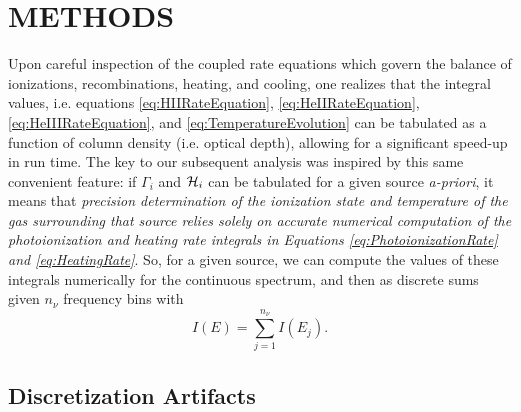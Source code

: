 \documentclass[preprint2]{aastex}              %
\begin{document}
\section{METHODS}
Upon careful inspection of the coupled rate equations which govern the balance
of ionizations, recombinations, heating, and cooling, one realizes that the
integral values, i.e. equations \ref{eq:HIIRateEquation},
\ref{eq:HeIIRateEquation}, \ref{eq:HeIIIRateEquation}, and
\ref{eq:TemperatureEvolution} can be tabulated as a function of column density
(i.e. optical depth), allowing for a significant speed-up in run time. The key
to our subsequent analysis was inspired by this same convenient feature: if
$\Gamma_i$ and $\mathcal{H}_i$ can be tabulated for a given source
\textit{a-priori}, it means that \textit{precision determination of the
ionization state and temperature of the gas surrounding that source relies
solely on accurate numerical computation of the photoionization and heating
rate integrals in Equations \ref{eq:PhotoionizationRate} and
\ref{eq:HeatingRate}}. So, for a given source, we can compute the values of
these integrals numerically for the continuous spectrum, and then as discrete
sums given $n_{\nu}$ frequency bins with
\begin{equation}
    I(E) = \sum_{j=1}^{n_{\nu}} I(E_j) .
\end{equation}


\subsection{Discretization Artifacts}


\end{document}
